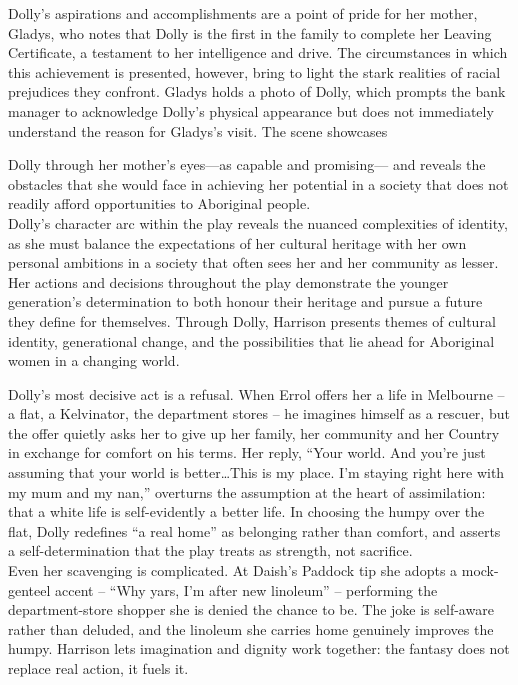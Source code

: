 \documentclass[a4paper]{article}
\begin{document}
Dolly's aspirations and accomplishments are a point of pride for her mother, Gladys, who notes that 
Dolly is the first in the family to complete her Leaving Certificate, a testament to her 
intelligence and drive. The circumstances in which this achievement is presented, however, bring to 
light the stark realities of racial prejudices they confront. Gladys holds a photo of Dolly, which 
prompts the bank manager to acknowledge Dolly's physical appearance but does not immediately 
understand the reason for Gladys's visit. The scene showcases

Dolly through her mother's eyes—as capable and promising— and reveals the obstacles that she would 
face in achieving her potential in a society that does not readily afford opportunities to 
Aboriginal people.\\

Dolly's character arc within the play reveals the nuanced complexities of identity, as she must 
balance the expectations of her cultural heritage with her own personal ambitions in a society that 
often sees her and her community as lesser. Her actions and decisions throughout the play 
demonstrate the younger generation's determination to both honour their heritage and pursue a 
future they define for themselves.
Through Dolly, Harrison presents themes of cultural identity,
generational change, and the possibilities that lie ahead for
Aboriginal women in a changing world.



Dolly's most decisive act is a refusal. When Errol offers her a life in Melbourne -- a flat, a Kelvinator, the department stores -- he imagines himself as a rescuer, but the offer quietly asks her to give up her family, her community and her Country in exchange for comfort on his terms. Her reply, ``Your world. And you're just assuming that your world is better\ldots This is my place. I'm staying right here with my mum and my nan,'' overturns the assumption at the heart of assimilation: that a white life is self-evidently a better life. In choosing the humpy over the flat, Dolly redefines ``a real home'' as belonging rather than comfort, and asserts a self-determination that the play treats as strength, not sacrifice.\\

Even her scavenging is complicated. At Daish's Paddock tip she adopts a mock-genteel accent -- ``Why yars, I'm after new linoleum'' -- performing the department-store shopper she is denied the chance to be. The joke is self-aware rather than deluded, and the linoleum she carries home genuinely improves the humpy. Harrison lets imagination and dignity work together: the fantasy does not replace real action, it fuels it.\\
\end{document}
